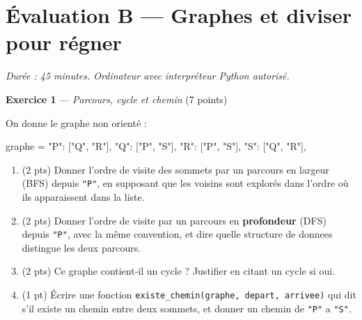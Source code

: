 \section*{Évaluation B --- Graphes et diviser pour régner}
\textit{Durée : 45 minutes. Ordinateur avec interpréteur Python autorisé.}


\bigskip

\textbf{Exercice 1} --- \textit{Parcours, cycle et chemin} \hfill (7 points)

On donne le graphe non orienté :
\begin{python}
graphe = {
    "P": ["Q", "R"],
    "Q": ["P", "S"],
    "R": ["P", "S"],
    "S": ["Q", "R"],
}
\end{python}
\begin{enumerate}
  \item (2 pts) Donner l'ordre de visite des sommets par un parcours en largeur (BFS) depuis \texttt{"P"}, en supposant que les voisins sont explorés dans l'ordre où ils apparaissent dans la liste.
  \item (2 pts) Donner l'ordre de visite par un parcours en \textbf{profondeur} (DFS) depuis
  \texttt{"P"}, avec la même convention, et dire quelle structure de donnees distingue les
  deux parcours.
  \item (2 pts) Ce graphe contient-il un cycle ? Justifier en citant un cycle si oui.
  \item (1 pt) Écrire une fonction \lstinline{existe_chemin(graphe, depart, arrivee)} qui dit
  s'il existe un chemin entre deux sommets, et donner un chemin de \texttt{"P"} a
  \texttt{"S"}.
\end{enumerate}

